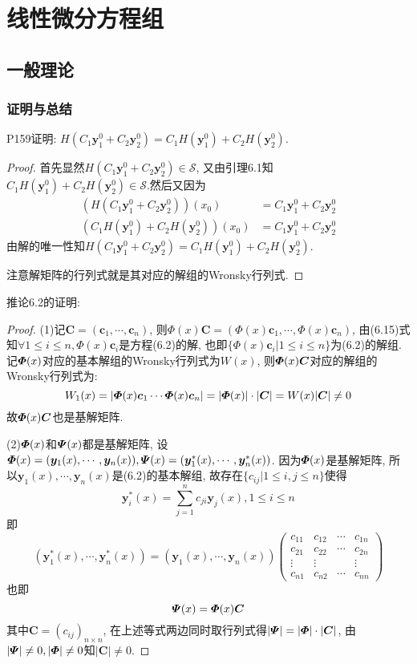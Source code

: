 \chapter{线性微分方程组}


\section{一般理论}


\subsection{证明与总结}


P159证明: $H(C_1\bm{y}_1^0+C_2\bm{y}_2^0)=C_1H(\bm{y}_1^0)+C_2H(\bm{y}_2^0)$.
\begin{proof} 首先显然$H(C_1\bm{y}_1^0+C_2\bm{y}_2^0)\in\mathcal{S}$, 
又由引理6.1知$C_1H(\bm{y}_1^0)+C_2H(\bm{y}_2^0)\in\mathcal{S}$.然后又因为
\[\begin{split}\left(H(C_1\bm{y}_1^0+C_2\bm{y}_2^0)\right)(x_0)&=C_1\bm{y}_1^0+C_2\bm{y}_2^0\\
\left(C_1H(\bm{y}_1^0)+C_2H(\bm{y}_2^0)\right)(x_0)&=C_1\bm{y}_1^0+C_2\bm{y}_2^0
\end{split}\]
由解的唯一性知$H(C_1\bm{y}_1^0+C_2\bm{y}_2^0)=C_1H(\bm{y}_1^0)+C_2H(\bm{y}_2^0)$.

注意解矩阵的行列式就是其对应的解组的Wronsky行列式.
\end{proof}

推论6.2的证明:

\begin{proof}
(1)记$\bm{C}=(\bm{c}_1,\cdots,\bm{c}_n)$, 则$\bm{\varPhi}(x)\bm{C}=(\bm{\varPhi}(x)\bm{c}_1,\cdots,\bm{\varPhi}(x)\bm{c}_n)$, 由(6.15)式知$\forall1\leq i\leq n,\bm{\varPhi}(x)\bm{c}_i$是方程(6.2)的解, 也即$\{\bm{\varPhi}(x)\bm{c}_i|1\leq i\leq n\}$为(6.2)的解组. 记$\bm{\varPhi}(x)$对应的基本解组的Wronsky行列式为$W(x)$, 则$\bm{\varPhi}(x)\bm{C}$对应的解组的Wronsky行列式为:
\[W_1(x)=|\bm{\varPhi}(x)\bm{c}_1\cdots\bm{\varPhi}(x)\bm{c}_n|=|\bm{\varPhi}(x)|\cdot|\bm{C}|=W(x)|\bm{C}|\neq0\]
故$\bm{\varPhi}(x)\bm{C}$也是基解矩阵.

(2)$\bm{\varPhi}(x)$和$\bm{\varPsi}(x)$都是基解矩阵, 
设$\bm{\varPhi}(x)=(\bm{y}_1(x),\cdots,\bm{y}_n(x)),\bm{\varPsi}(x)=(\bm{y}_1^*(x),\cdots,\bm{y}_n^*(x))$. 
因为$\bm{\varPhi}(x)$是基解矩阵, 所以$\bm{y}_1(x),\cdots,\bm{y}_n(x)$是(6.2)的基本解组, 
故存在$\{c_{ij}|1\leq i,j\leq n\}$使得\[\bm{y}_i^*(x)=\sum_{j=1}^nc_{ji}\bm{y}_j(x),1\leq i\leq n\]
即\[(\bm{y}_1^*(x),\cdots,\bm{y}_n^*(x))=(\bm{y}_1(x),\cdots,\bm{y}_n(x))
\begin{pmatrix}
c_{11}&c_{12}&\cdots&c_{1n}\\
c_{21}&c_{22}&\cdots&c_{2n}\\
\vdots&\vdots&&\vdots\\
c_{n1}&c_{n2}&\cdots&c_{nn}
\end{pmatrix}\]
也即\[\bm{\varPsi}(x)=\bm{\varPhi}(x)\bm{C}\]
其中$\bm{C}=(c_{ij})_{n\times n}$, 在上述等式两边同时取行列式得$|\bm{\varPsi}|=|\bm{\varPhi}|\cdot|\bm{C}|$, 
由$|\bm{\varPsi}|\neq0,|\bm{\varPhi}|\neq0$知$|\bm{C}|\neq0$.
\end{proof}


